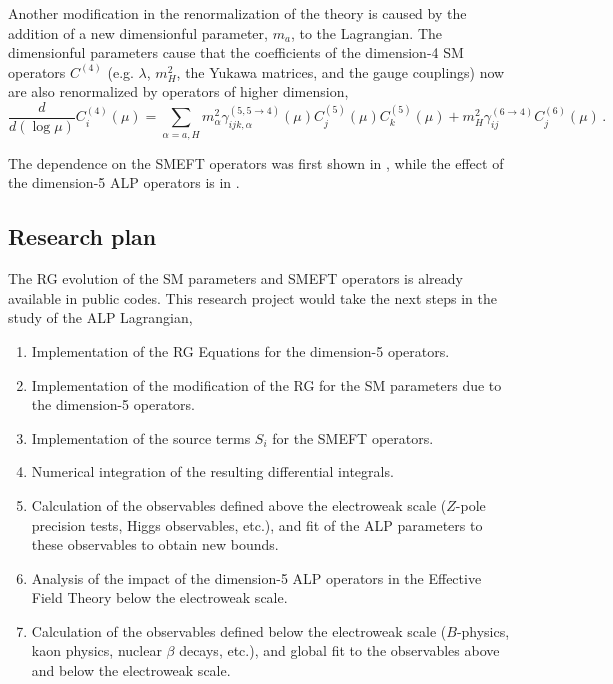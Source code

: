 \documentclass[combined.tex]{subfiles}
\begin{document}
Another modification in the renormalization of the theory is caused by the addition of a new dimensionful parameter, $m_a$, to the Lagrangian. The dimensionful parameters cause  that the coefficients of the dimension-4 SM operators $C^{(4)}$ (e.g. $\lambda$, $m_H^2$, the Yukawa matrices, and the gauge couplings) now are also renormalized by operators of higher dimension,
\begin{equation}
\frac{d}{d(\log\mu)} C^{(4)}_i (\mu) = \sum_{\alpha = a, H} m_\alpha^2 \gamma_{ijk,\alpha}^{(5,5\to4)}(\mu) C_j^{(5)}(\mu) C_k^{(5)}(\mu) + m_H^2 \gamma_{ij}^{(6\to4)} C_j^{(6)}(\mu)\,.
\end{equation}

The dependence on the SMEFT operators was first shown in \cite{Jenkins:2013zja}, while the effect of the dimension-5 ALP operators is in \cite{Galda:2021hbr}.

\subsection{Research plan}
The RG evolution of the SM parameters and SMEFT operators is already available in public codes. This research project would take the next steps in the study of the ALP Lagrangian,
\begin{enumerate}
\item Implementation of the RG Equations for the dimension-5 operators.
\item Implementation of the modification of the RG for the SM parameters due to the dimension-5 operators.
\item Implementation of the source terms $S_i$ for the SMEFT operators.
\item Numerical integration of the resulting differential integrals.
\item Calculation of the observables defined above the electroweak scale ($Z$-pole precision tests, Higgs observables, etc.), and fit of the ALP parameters to these observables to obtain new bounds.
\item Analysis of the impact of the dimension-5 ALP operators in the Effective Field Theory below the electroweak scale.
\item Calculation of the observables defined below the electroweak scale ($B$-physics, kaon physics, nuclear $\beta$ decays, etc.), and global fit to the observables above and below the electroweak scale.
\end{enumerate}
\end{document}
